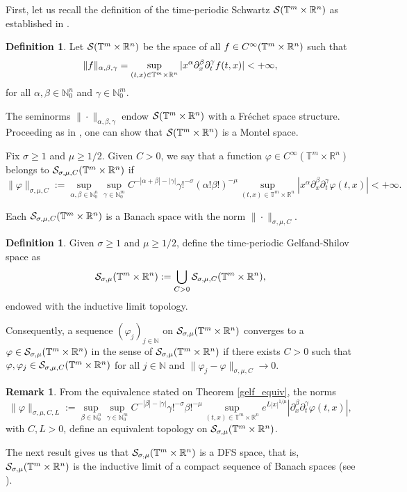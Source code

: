 \documentclass[11pt,reqno]{amsart}
\numberwithin{equation}{section}
\theoremstyle{definition}
\newtheorem{obs}{Remark}
\theoremstyle{definition}
\newtheorem{definition}[theorem]{Definition}
\newcommand{\T}{\mathbb{T}}
\newcommand{\G}{\mathnormal{\mathbb{T}^{m}\times\mathbb{R}^n}}
\newcommand{\R}{\mathbb{R}}
\newcommand{\N}{\mathbb{N}}
\renewcommand{\S}{\mathcal{S}_{\sigma,\mu}(\G)}
\newcommand{\SC}{\mathcal{S}_{\sigma,\mu,C}(\G)}
\begin{document}
First, let us recall the definition of the time-periodic Schwartz $\mathcal{S}(\G)$ as established in \cite{KowTmRn,Kow_chap}.

\begin{definition}
    Let $\mathcal{S}(\G)$ be the space of all $f\in C^\infty(\G)$ such that
    \[\|f\|_{\alpha,\beta,\gamma} = \sup_{(t,x)\in \G}|x^\alpha\partial_x^\beta\partial_t^\gamma f(t,x)|<+\infty,\]
    for all $\alpha,\beta\in\mathbb{N}_0^n$ and $\gamma\in\mathbb{N}_0^m$.
\end{definition}

The seminorms $\|\cdot\|_{\alpha,\beta,\gamma}$ endow $\mathcal{S}(\G)$ with a Fr\'echet space structure. Proceeding as in \cite[Theorem 14.4]{Treves_TVS}, one can show that $\mathcal{S}(\G)$ is a Montel space.

Fix $\sigma\geq 1$ and $\mu\geq 1/2$. Given $C>0$, we say that a function $\varphi\in C^\infty(\T^m\times\R^n)$ belongs to $\SC$ if
\[\|\varphi\|_{\sigma,\mu,C}:=\sup_{\alpha,\beta\in\N_0^n}\sup_{\gamma\in \N_0^m} C^{-|\alpha+\beta|-|\gamma|}\gamma!^{-\sigma}(\alpha!\beta!)^{-\mu}\sup_{(t,x)\in\T^m\times\R^n}|x^\alpha\partial_x^\beta\partial_t^\gamma \varphi(t,x)|<+\infty.\]

Each $\SC$ is a Banach space with the norm $\|\cdot\|_{\sigma,\mu,C}$.

\begin{definition}
    Given $\sigma\geq 1$ and $\mu\geq 1/2$, define the time-periodic Gelfand-Shilov space as
\[\S:=\bigcup_{C>0}\SC,\]
endowed with the inductive limit topology.
\end{definition}

Consequently, a sequence $(\varphi_j)_{j\in\N}$ on $\S$ converges to a $\varphi\in\S$ in the sense of $\S$ if there exists $C>0$ such that $\varphi,\varphi_j\in \mathcal{S}_{\sigma,\mu,C}(\G)$ for all $j\in\N$ and $\|\varphi_j-\varphi\|_{\sigma,\mu,C}\to 0$.

\begin{obs}\label{equiv_tpgelf}
    From the equivalence stated on Theorem \ref{gelf_equiv}, the norms
    \[\|\varphi\|_{\sigma,\mu,C,L}:=\sup_{\beta\in\N_0^n}\sup_{\gamma\in \N_0^m} C^{-|\beta|-|\gamma|}\gamma!^{-\sigma}\beta!^{-\mu}\sup_{(t,x)\in\T^m\times\R^n}e^{L|x|^{1/\mu}}|\partial_x^\beta\partial_t^\gamma \varphi(t,x)|,\]
    with $C,L>0$, define an equivalent topology on $\S$.
\end{obs}

The next result gives us that $\S$ is a DFS space, that is, $\S$ is the inductive limit of a compact sequence of Banach spaces (see \cite{Komatsu1967}).
\end{document}
